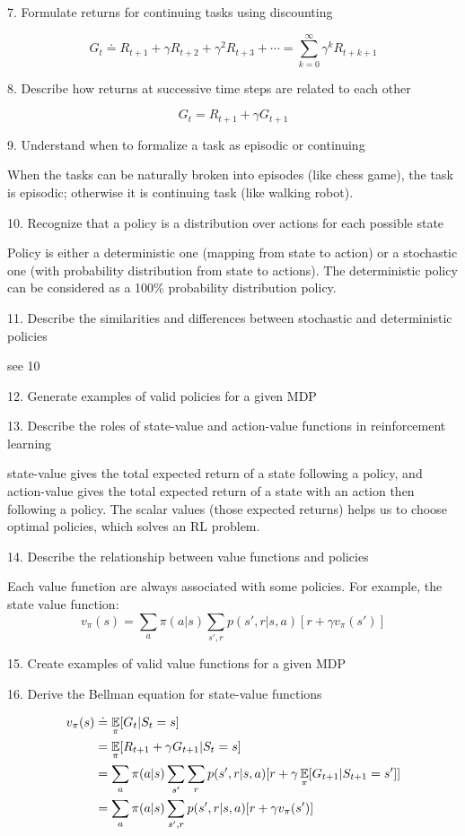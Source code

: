 \documentclass[sutton_barto_notes.tex]{subfiles}
\begin{document}
7. Formulate returns for continuing tasks using discounting

$$ G_t \doteq R_{t+1} + \gamma R_{t+2} + \gamma^2 R_{t+3} + \cdots = \sum_{k=0}^{\infty} \gamma^k R_{t+k+1} $$

8. Describe how returns at successive time steps are related to each other

$$ G_t = R_{t+1} + \gamma G_{t+1} $$

9. Understand when to formalize a task as episodic or continuing

When the tasks can be naturally broken into episodes (like chess game), the task is episodic; otherwise it is continuing task (like walking robot).

10. Recognize that a policy is a distribution over actions for each possible state

Policy is either a deterministic one (mapping from state to action) or a stochastic one (with probability distribution from state to actions).
The deterministic policy can be considered as a 100\% probability distribution policy.

11. Describe the similarities and differences between stochastic and deterministic policies

see 10

12. Generate examples of valid policies for a given MDP

13. Describe the roles of state-value and action-value functions in reinforcement learning

state-value gives the total expected return of a state following a policy, and action-value gives the total expected return of a state with an action then following a policy.
The scalar values (those expected returns) helps us to choose optimal policies, which solves an RL problem.

14. Describe the relationship between value functions and policies

Each value function are always associated with some policies. For example, the state value function:
$$v_\pi (s) = \sum_a \pi (a|s) \sum_{s',r} p(s',r|s,a)[r+\gamma v_\pi(s')] $$

15. Create examples of valid value functions for a given MDP

16. Derive the Bellman equation for state-value functions

\begin{align*}
v_\pi(s) & \doteq \operatorname*{\mathbb{E}}_\pi[G_t | S_t = s]\\
& = \operatorname*{\mathbb{E}}_\pi[R_{t+1} + \gamma G_{t+1} | S_t = s]\\
& = \sum_a \pi(a|s) \sum_{s'}\sum_r p(s',r|s,a) [r+ \gamma \operatorname*{\mathbb{E}}_\pi[G_{t+1} | S_{t+1}=s']]\\
& = \sum_a \pi(a|s) \sum_{s',r} p(s',r|s,a) [r+ \gamma v_\pi(s')]
\end{align*}
\end{document}
